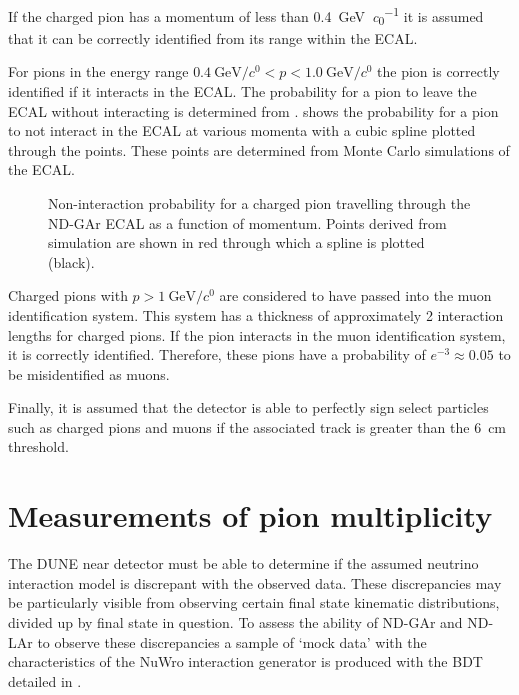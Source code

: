 If the charged pion has a momentum of less than \SI{0.4}{\GeV\per\clight} it is assumed that it can be correctly identified from its range within the ECAL.

For pions in the energy range $\SI{0.4}{\GeV\per\clight} < p < \SI{1.0}{\GeV\per\clight}$ the pion is correctly identified if it interacts in the ECAL.
The probability for a pion to leave the ECAL without interacting is determined from .
 shows the probability for a pion to not interact in the ECAL at various momenta with a cubic spline plotted through the points.
These points are determined from Monte Carlo simulations of the ECAL.

\begin{figure}[h]
	\centering
	\begin{adjustbox}{max totalsize=.6\linewidth, center}
		
	\end{adjustbox}
	\caption[Non-interaction probability for a charged pion travelling through the ND-GAr ECAL as a function of momentum.]{Non-interaction probability for a charged pion travelling through the ND-GAr ECAL as a function of momentum. Points derived from simulation are shown in red through which a spline is plotted (black).}
	\label{fig:interactionSpline}
\end{figure}

Charged pions with $p>\SI{1}{\GeV\per\clight}$ are considered to have passed into the muon identification system. 
This system has a thickness of approximately 2 interaction lengths for charged pions.
If the pion interacts in the muon identification system, it is correctly identified.
Therefore, these pions have a probability of $e^{-3} \approx 0.05$ to be misidentified as muons.

Finally, it is assumed that the detector is able to perfectly sign select particles such as charged pions and muons if the associated track is greater than the \SI{6}{\cm} threshold.

\section{Measurements of pion multiplicity}
\label{sec:dune_ndrwt:pionMulti}

The DUNE near detector must be able to determine if the assumed neutrino interaction model is discrepant with the observed data.
These discrepancies may be particularly visible from observing certain final state kinematic distributions, divided up by final state in question.
To assess the ability of ND-GAr and ND-LAr to observe these discrepancies a sample of `mock data' with the characteristics of the NuWro interaction generator is produced with the BDT detailed in .


